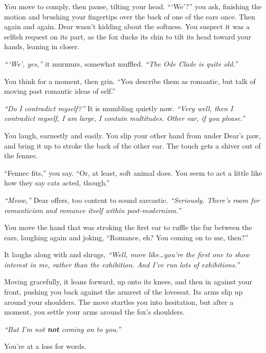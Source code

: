 You move to comply, then pause, tilting your head. ```We'?'' you ask, finishing the motion and brushing your fingertips over the back of one of the ears once. Then again and again. Dear wasn't kidding about the softness. You suspect it was a selfish request on its part, as the fox ducks its chin to tilt its head toward your hands, leaning in closer.

\emph{```We', yes,''} it murmurs, somewhat muffled. \emph{``The Ode Clade is quite old.''}

You think for a moment, then grin. ``You describe them as romantic, but talk of moving past romantic ideas of self.''

\emph{``Do I contradict myself?''} It is mumbling quietly now. \emph{``Very well, then I contradict myself, I am large, I contain multitudes. Other ear, if you please.''}

You laugh, earnestly and easily. You slip your other hand from under Dear's paw, and bring it up to stroke the back of the other ear. The touch gets a shiver out of the fennec.

``Fennec fits,'' you say. ``Or, at least, soft animal does. You seem to act a little like how they say cats acted, though.''

\emph{``Meow,''} Dear offers, too content to sound sarcastic. \emph{``Seriously. There's room for romanticism and romance itself within post-modernism.''}

You move the hand that was stroking the first ear to ruffle the fur between the ears, laughing again and joking, ``Romance, eh? You coming on to me, then?''

It laughs along with and shrugs, \emph{``Well, more like\ldots{}you're the first one to show interest in me, rather than the exhibition. And I've run lots of exhibitions.''}

Moving gracefully, it leans forward, up onto its knees, and then in against your front, pushing you back against the armrest of the loveseat. Its arms slip up around your shoulders. The move startles you into hesitation, but after a moment, you settle your arms around the fox's shoulders.

\emph{``But I'm not \textbf{not} coming on to you.''}

You're at a loss for words.

\phantom{You're at a loss for words. }{\tiny ``I'm flattered, but--''}

\phantom{You're at a loss for words. }{\tiny ``You're sweet, you know--''}

